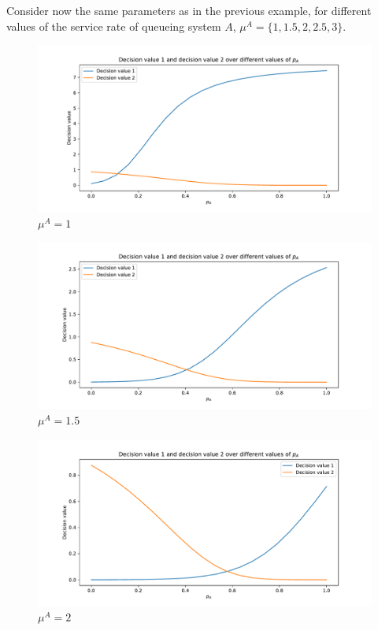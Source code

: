 Consider now the same parameters as in the previous example, for different
values of the service rate of queueing system \(A\), \(\mu^A =
\{1,1.5,2,2.5,3\}\).

\begin{figure}[H]
    \centering
    \includegraphics[width=\textwidth]{chapters/04_game_theoretic_model/img/brents_method/brent_method_example_mu_A_1.0.pdf}
    \caption{\(\mu^A = 1\)}
    \label{fig:brent_method_example_mu_A_1}
\end{figure}

\begin{figure}[H]
    \centering
    \includegraphics[width=\textwidth]{chapters/04_game_theoretic_model/img/brents_method/brent_method_example_mu_A_1.5.pdf}
    \caption{\(\mu^A = 1.5\)}
    \label{fig:brent_method_example_mu_A_2}
\end{figure}

\begin{figure}[H]
    \centering
    \includegraphics[width=\textwidth]{chapters/04_game_theoretic_model/img/brents_method/brent_method_example_mu_A_2.0.pdf}
    \caption{\(\mu^A = 2\)}
    \label{fig:brent_method_example_mu_A_3}
\end{figure}

